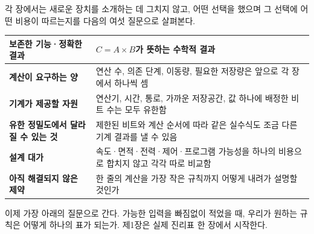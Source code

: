 각 장에서는 새로운 장치를 소개하는 데 그치지 않고, 어떤 선택을 했으며 그 선택에 어떤 비용이 따르는지를 다음의 여섯 질문으로 살펴본다.

\begin{center}
\small
\begin{tabular}{>{\raggedright\arraybackslash\sffamily\bfseries}p{} >{\raggedright\arraybackslash}p{}}
\toprule
보존한 기능·정확한 결과 & \(C=A\times B\)가 뜻하는 수학적 결과 \\
\midrule
계산이 요구하는 양 & 연산 수, 의존 단계, 이동량, 필요한 저장량은 앞으로 각 장에서 하나씩 셈 \\
\midrule
기계가 제공할 자원 & 연산기, 시간, 통로, 가까운 저장공간, 값 하나에 배정한 비트 수는 모두 유한함 \\
\midrule
유한 정밀도에서 달라질 수 있는 것 & 제한된 비트와 계산 순서에 따라 같은 실수식도 조금 다른 기계 결과를 낼 수 있음 \\
\midrule
설계 대가 & 속도·면적·전력·제어·프로그램 가능성을 하나의 비용으로 합치지 않고 각각 따로 비교함 \\
\midrule
아직 해결되지 않은 제약 & 한 줄의 계산을 가장 작은 규칙까지 어떻게 내려가 설명할 것인가 \\
\bottomrule
\end{tabular}
\end{center}

이제 가장 아래의 질문으로 간다. 가능한 입력을 빠짐없이 적었을 때, 우리가 원하는 규칙은 어떻게 하나의 표가 되는가. 제1장은 실제 진리표 한 장에서 시작한다.
